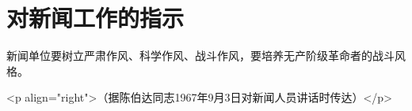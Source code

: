 \section[对新闻工作的指示（一九六七年九月）]{对新闻工作的指示}


新闻单位要树立严肃作风、科学作风、战斗作风，要培养无产阶级革命者的战斗风格。

<p align="right">（据陈伯达同志1967年9月3日对新闻人员讲话时传达）</p>


